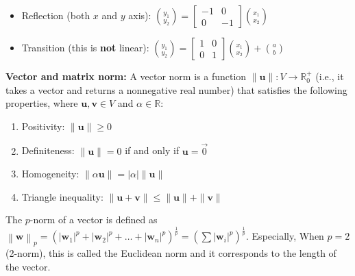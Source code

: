 \documentclass[12pt]{article}
\newcommand\norm[1]{\left\lVert#1\right\rVert}
\begin{document}
\begin{itemize}
\begin{itemize}
                \item Reflection (both $x$ and $y$ axis): $\displaystyle {y_1 \choose y_2} = \begin{bmatrix} { -1} & { 0} \\ { 0} & { -1} \end{bmatrix} {x_1 \choose x_2}$
                \item Transition (this is \textbf{not} linear): $\displaystyle {y_1 \choose y_2} = \begin{bmatrix} { 1} & { 0} \\ { 0} & { 1} \end{bmatrix} {x_1 \choose x_2} + {a \choose b}$
            \end{itemize}
    \end{itemize}
    

\newpage
\noindent \textbf{Vector and matrix norm:} A vector norm is a function $\norm{\mathbf{u}} : V \to \mathbb{R}^+_0$ (i.e., it takes a vector and returns a nonnegative real number) that satisfies the following properties, where $\mathbf{u}, \mathbf{v} \in V$ and $\alpha \in \mathbb{R}$:
    \begin{enumerate}
        \item Positivity: $\norm{\mathbf{u}} \ge 0$
        \item Definiteness: $\|\mathbf{u}\| = 0$ if and only if $\mathbf{u} = \vec{0}$
        \item Homogeneity: $\norm{\alpha \mathbf{u}} = |\alpha| \norm{\mathbf{u}}$
        \item Triangle inequality: $\|\mathbf{u} + \mathbf{v}\| \leq \|\mathbf{u}\| + \|\mathbf{v}\|$
    \end{enumerate}

    The $p$-norm of a vector is defined as $\displaystyle \norm{\mathbf{w}}_p = \left( |\mathbf{w}_1|^p + |\mathbf{w}_2|^p + \dots + |\mathbf{w}_n|^p \right) ^{\frac{1}{p}} = \left( \sum |\mathbf{w}_i| ^p \right) ^{\frac{1}{p}}$. Especially, When $p = 2$
 (2-norm), this is called the Euclidean norm and it corresponds to the length of the vector.
\end{document}
